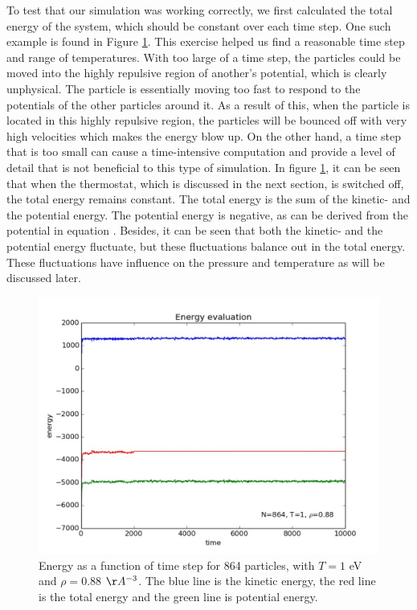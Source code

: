 \documentclass{article}
\begin{document}
\begin{multicols}{2}
To test that our simulation was working correctly, we first calculated the total energy of the system, which should be constant over each time step.  One such example is found in Figure \ref{engcons}.  This exercise helped us find a reasonable time step and range of temperatures.  With too large of a time step, the particles could be moved into the highly repulsive region of another's potential, which is clearly unphysical. The particle is essentially moving too fast to respond to the potentials of the other particles around it. As a result of this, when the particle is located in this highly repulsive region, the particles will be bounced off with very high velocities which makes the energy blow up. On the other hand, a time step that is too small can cause a time-intensive computation and provide a level of detail that is not beneficial to this type of simulation. In figure \ref{engcons}, it can be seen that when the thermostat, which is discussed in the next section, is switched off, the total energy remains constant. The total energy is the sum of the kinetic- and the potential energy. The potential energy is negative, as can be derived from the potential in equation \label{LJpot}. Besides, it can be seen that both the kinetic- and the potential energy fluctuate, but these fluctuations balance out in the total energy. These fluctuations have influence on the pressure and temperature as will be discussed later.\\

\begin{figure}[H]
\begin{center}
\includegraphics[width=\linewidth]{plots/energyT1rho088N864lpnum1000.pdf}
\caption{Energy as a function of time step for 864 particles, with $T=1$ eV and $\rho = 0.88$ $\AA ^{-3}$.  The blue line is the kinetic energy, the red line is the total energy and the green line is potential energy.}
\label{engcons}
\end{center}
\end{figure}


\end{multicols}
\end{document}
